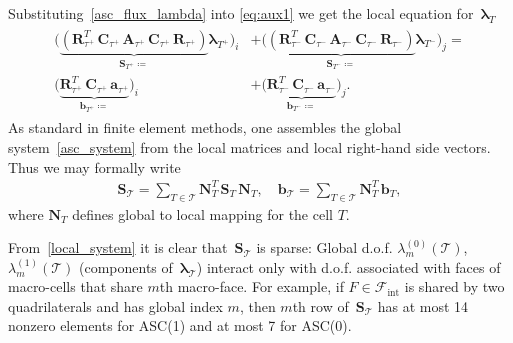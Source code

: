 \documentclass[12pt]{article}
\newcommand{\vect}[1]{\boldsymbol{\mathbf{#1}}}
\newcommand{\bcell}{T}
\newcommand{\bmesh}{{\vect{\mathcal T}}}
\newcommand{\mmesh}{{\vect{\mathcal \tau}}}
\newcommand{\bfaces}[1][]{{\vect{\mathcal F}_{\text{#1}}}}
\begin{document}
	Substituting~\eqref{asc_flux_lambda} into \eqref{eq:aux1} we get the local equation for~${\vect \lambda}_\bcell$
	\begin{align}\label{local_system}
		\begin{split}
			\Big( \underbrace{\left( \vect R^T_{\mmesh^+}\,\vect C_{\mmesh^+}\,\vect A_{\mmesh^+}\,\vect C_{\mmesh^+}\,\vect R_{\mmesh^+} \right)}_{\vect S_{\bcell^+} \coloneqq} {\vect \lambda}_{\bcell^+} \Big)_i
			&+
			\Big( \underbrace{\left( \vect R^T_{\mmesh^-}\,\vect C_{\mmesh^-}\,\vect A_{\mmesh^-}\,\vect C_{\mmesh^-}\,\vect R_{\mmesh^-} \right)}_{\vect S_{\bcell^-} \coloneqq} {\vect \lambda}_{\bcell^-} \Big)_j = \\
			\big( \underbrace{\vect R^T_{\mmesh^+}\,\vect C_{\mmesh^+}\,{\vect a}_{\mmesh^+}}_{{\vect b}_{\bcell^+} \coloneqq} \big)_i
			&+
			\big( \underbrace{\vect R^T_{\mmesh^-}\,\vect C_{\mmesh^-}\,{\vect a}_{\mmesh^-}}_{{\vect b}_{\bcell^-} \coloneqq} \big)_j.
		\end{split}
	\end{align}
	As standard in finite element methods, one assembles the global system~\eqref{asc_system} from the local matrices and local right-hand side vectors.  Thus we may formally write
	\begin{align}\label{global_system_assembly}
		\vect S_\bmesh = \sum_{\bcell \in \bmesh} \vect N^T_\bcell\,\vect S_\bcell\,\vect N_\bcell, \quad
		{\vect b}_\bmesh = \sum_{\bcell \in \bmesh} \vect N^T_\bcell\,{\vect b}_\bcell,
	\end{align}
	where $\vect N_\bcell$ defines global to local mapping for the cell $T$.
	
	From~\eqref{local_system} it is clear that~$\vect S_\bmesh$ is sparse: Global d.o.f. $\lambda^{(0)}_m(\bmesh)$, $\lambda^{(1)}_m(\bmesh)$ (components of~$\vect\lambda_\bmesh$) interact only with d.o.f. associated with faces of macro-cells that share $m$th macro-face. For example, if $F\in\bfaces[int]$ is shared by two quadrilaterals and has global index $m$, then $m$th row of~$\vect S_\bmesh$ has at most 14 nonzero elements for ASC(1) and at most 7 for ASC(0). %
	
\end{document}

